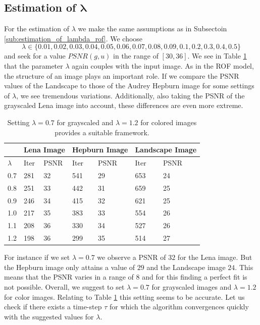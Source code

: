\documentclass[abstracton]{scrreprt}
\begin{document}
        \subsection{Estimation of $\boldsymbol{\lambda}$} %
        \label{sub:estimation_of_lambda_tvl1}
            For the estimation of $\lambda$ we make the same assumptions as in Subsectoin \ref{sub:estimation_of_lambda_rof}. We choose
                $$
                    \lambda \in \{ 0.01, 0.02, 0.03, 0.04, 0.05, 0.06, 0.07, 0.08, 0.09, 0.1, 0.2, 0.3, 0.4, 0.5 \}
                $$
            and seek for a value $PSNR(g, u)$ in the range of $[30, 36]$. We see in Table \ref{tab:estimation_of_lambda_tvl1} that the parameter $\lambda$ again couples with the input image. As in the ROF model, the structure of an image plays an important role. If we compare the PSNR values of the Landscape to those of the Audrey Hepburn image for some settings of $\lambda$, we see tremendous variations. Additionally, also taking the PSNR of the grayscaled Lena image into account, these differences are even more extreme.
            \begin{table}[!ht]
                \centering
                \begin{tabular}{| l | l | l | l | l | l | l |}
                    \hline
                    & \multicolumn{2}{|c|}{Lena Image} & \multicolumn{2}{|c|}{Hepburn Image} & \multicolumn{2}{|c|}{Landscape Image} \\ \hline\hline
                    $\lambda$ & Iter & PSNR & Iter & PSNR & Iter & PSNR \\ \hline
                    0.7 & 281 & 32 & 541 & 29 & 653 & 24 \\ \hline
                    0.8 & 251 & 33 & 442 & 31 & 659 & 25 \\ \hline
                    0.9 & 246 & 34 & 415 & 32 & 621 & 25 \\ \hline
                    1.0 & 217 & 35 & 383 & 33 & 554 & 26 \\ \hline
                    1.1 & 208 & 36 & 330 & 34 & 527 & 26 \\ \hline
                    1.2 & 198 & 36 & 299 & 35 & 514 & 27 \\ \hline
                \end{tabular}
                \caption[Best estimate of $\lambda$ for the TVL1 model.]{Setting $\lambda = 0.7$ for grayscaled and $\lambda = 1.2$ for colored images provides a suitable framework.}
                \label{tab:estimation_of_lambda_tvl1}
            \end{table}
            For instance if we set $\lambda = 0.7$ we observe a PSNR of $32$ for the Lena image. But the Hepburn image only attains a value of $29$ and the Landscape image $24$. This means that the PSNR varies in a range of $8$ and for this finding a perfect fit is not possible. Overall, we suggest to set $\lambda = 0.7$ for grayscaled images and $\lambda = 1.2$ for color images. Relating to Table \ref{tab:estimation_of_lambda_tvl1} this setting seems to be accurate. Let us check if there exists a time-step $\tau$ for which the algorithm convergences quickly with the suggested values for $\lambda$.
\end{document}

